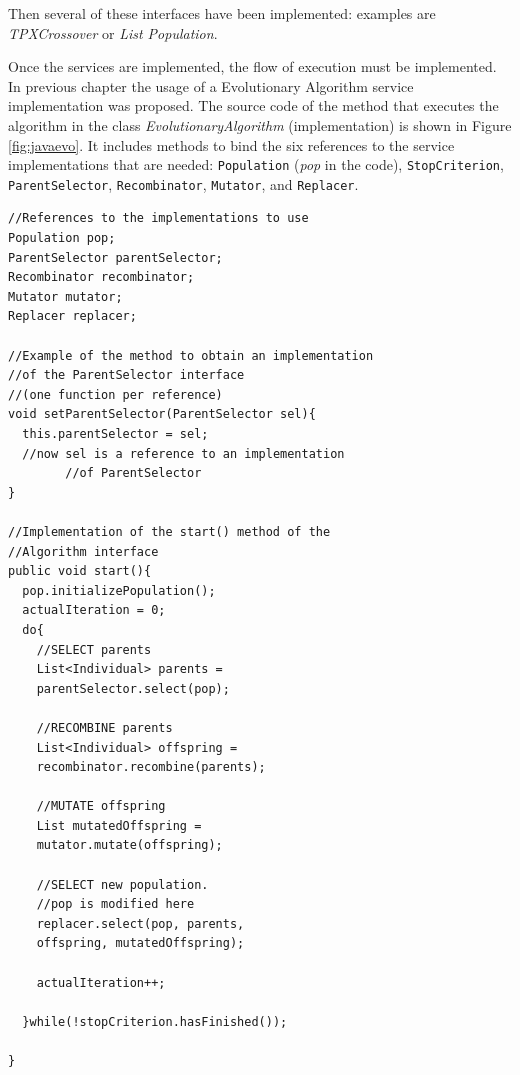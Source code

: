 Then several of these interfaces have been implemented: examples are {\em TPXCrossover} or {\em List Population}.

Once the services are implemented, the flow of execution must be implemented. In previous chapter the usage of a Evolutionary Algorithm service implementation was proposed. The source code of the method that executes the algorithm in the class
{\em EvolutionaryAlgorithm} (implementation) is shown in Figure
\ref{fig:javaevo}. It includes methods to bind the six references
to the service implementations that are needed: \texttt{Population} ({\em pop}
in the code), \texttt{StopCriterion}, \texttt{ParentSelector}, \texttt{Recombinator}, \texttt{Mutator},
and \texttt{Replacer}.  %


\newsavebox{\mintedbox} %
\begin{lrbox}{\mintedbox}
\begin{minipage}{10cm}
\begin{verbatim}
//References to the implementations to use
Population pop;
ParentSelector parentSelector;
Recombinator recombinator;
Mutator mutator;
Replacer replacer;

//Example of the method to obtain an implementation
//of the ParentSelector interface 
//(one function per reference)
void setParentSelector(ParentSelector sel){
  this.parentSelector = sel;
  //now sel is a reference to an implementation 
        //of ParentSelector
}

//Implementation of the start() method of the 
//Algorithm interface
public void start(){
  pop.initializePopulation();
  actualIteration = 0;
  do{
    //SELECT parents
    List<Individual> parents = 
    parentSelector.select(pop);
      
    //RECOMBINE parents
    List<Individual> offspring = 
    recombinator.recombine(parents);
      
    //MUTATE offspring
    List mutatedOffspring = 
    mutator.mutate(offspring);
      
    //SELECT new population. 
    //pop is modified here
    replacer.select(pop, parents, 
    offspring, mutatedOffspring);
      
    actualIteration++;
      
  }while(!stopCriterion.hasFinished());
    
}
\end{verbatim}
\end{minipage}
\end{lrbox}
